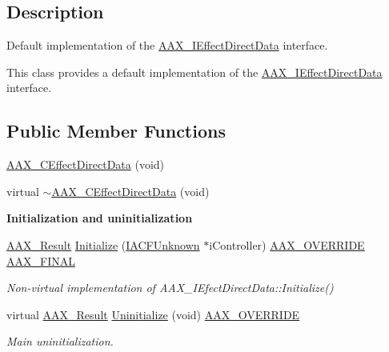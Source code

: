 \subsection{Description}
Default implementation of the \hyperlink{a00097}{A\+A\+X\+\_\+\+I\+Effect\+Direct\+Data} interface. 

This class provides a default implementation of the \hyperlink{a00097}{A\+A\+X\+\_\+\+I\+Effect\+Direct\+Data} interface. \subsection*{Public Member Functions}
\begin{DoxyCompactItemize}
\item 
\hyperlink{a00016_a4a3e96ae0ad1f0be1813b27657f66fd9}{A\+A\+X\+\_\+\+C\+Effect\+Direct\+Data} (void)
\item 
virtual \hyperlink{a00016_a8dd2b1e2a6464cd59319047185e4e899}{$\sim$\+A\+A\+X\+\_\+\+C\+Effect\+Direct\+Data} (void)
\end{DoxyCompactItemize}
\begin{Indent}{\bf Initialization and uninitialization}\par
\begin{DoxyCompactItemize}
\item 
\hyperlink{a00149_a4d8f69a697df7f70c3a8e9b8ee130d2f}{A\+A\+X\+\_\+\+Result} \hyperlink{a00016_ad89ee93781539d8df3b0710a186c7e0d}{Initialize} (\hyperlink{a00146}{I\+A\+C\+F\+Unknown} $\ast$i\+Controller) \hyperlink{a00149_ac2f24a5172689ae684344abdcce55463}{A\+A\+X\+\_\+\+O\+V\+E\+R\+R\+I\+D\+E} \hyperlink{a00149_aa4da4a09e940c332a2205e34e0677f40}{A\+A\+X\+\_\+\+F\+I\+N\+A\+L}
\begin{DoxyCompactList}\small\item\em Non-\/virtual implementation of A\+A\+X\+\_\+\+I\+Efect\+Direct\+Data\+::\+Initialize() \end{DoxyCompactList}\item 
virtual \hyperlink{a00149_a4d8f69a697df7f70c3a8e9b8ee130d2f}{A\+A\+X\+\_\+\+Result} \hyperlink{a00016_a3263ebf2e9e71dbb71c0b54177051f8a}{Uninitialize} (void) \hyperlink{a00149_ac2f24a5172689ae684344abdcce55463}{A\+A\+X\+\_\+\+O\+V\+E\+R\+R\+I\+D\+E}
\begin{DoxyCompactList}\small\item\em Main uninitialization. \end{DoxyCompactList}\end{DoxyCompactItemize}
\end{Indent}

